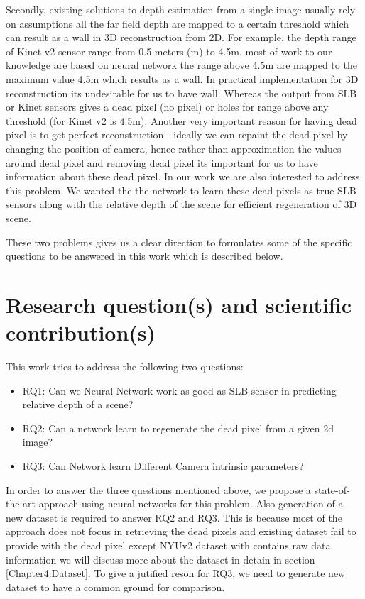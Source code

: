 Secondly, existing solutions to depth estimation from a single image usually rely on assumptions all the far field depth are mapped to a certain threshold which can result as a wall in 3D reconstruction from 2D. For example, the depth range of Kinet v2 sensor range from 0.5 meters (m) to 4.5m, most of work to our knowledge are based on neural network the range above 4.5m are mapped to the maximum value 4.5m \cite{Silberman:ECCV12} which results as a wall. In practical implementation for 3D reconstruction its undesirable for us to have wall. Whereas the output from SLB or Kinet sensors gives a dead pixel (no pixel) or holes for range above any threshold (for Kinet v2 is 4.5m). Another very important reason for having dead pixel is to get perfect reconstruction - ideally we can repaint the dead pixel by changing the position of camera, hence rather than approximation the values around dead pixel and removing dead pixel its important for us to have information about these dead pixel. In our work we are also interested to address this problem. We wanted the the network to learn these dead pixels as true SLB sensors along with the relative depth of the scene for efficient regeneration of 3D scene. 

These two problems gives us a clear direction to formulates some of the specific questions to be answered in this work which is described below. 


\section{Research question(s) and scientific contribution(s)}

This work tries to address the following two questions:
\begin{itemize}
    \item RQ1: Can we Neural Network work as good as SLB sensor in predicting relative depth of a scene?
    \item RQ2: Can a network learn to regenerate the dead pixel from a given 2d image?
    \item RQ3: Can Network learn Different Camera intrinsic parameters?  
\end{itemize}

In order to answer the three questions mentioned above, we propose a state-of-the-art approach using neural networks for this problem. Also generation of a new dataset is required to answer RQ2 and RQ3. This is because most of the approach does not focus in retrieving the dead pixels and existing dataset  fail to provide with the dead pixel except NYUv2 dataset with contains raw data information we will discuss more about the dataset in detain in section \ref{Chapter4:Dataset}. To give a jutified reson for RQ3, we need to generate new dataset to have a common ground for comparison. 

